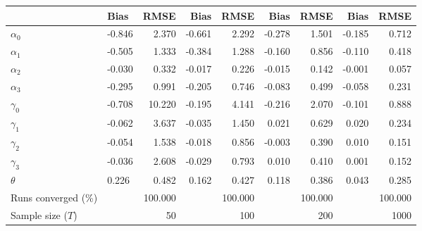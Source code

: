 
\begin{tabular}[t]{llrrrrrrr}
\toprule
  & Bias & RMSE & Bias & RMSE & Bias & RMSE & Bias & RMSE\\
\midrule
$\alpha_{0}$ & -0.846 & 2.370 & -0.661 & 2.292 & -0.278 & 1.501 & -0.185 & 0.712\\
$\alpha_{1}$ & -0.505 & 1.333 & -0.384 & 1.288 & -0.160 & 0.856 & -0.110 & 0.418\\
$\alpha_{2}$ & -0.030 & 0.332 & -0.017 & 0.226 & -0.015 & 0.142 & -0.001 & 0.057\\
$\alpha_{3}$ & -0.295 & 0.991 & -0.205 & 0.746 & -0.083 & 0.499 & -0.058 & 0.231\\
$\gamma_{0}$ & -0.708 & 10.220 & -0.195 & 4.141 & -0.216 & 2.070 & -0.101 & 0.888\\
$\gamma_{1}$ & -0.062 & 3.637 & -0.035 & 1.450 & 0.021 & 0.629 & 0.020 & 0.234\\
$\gamma_{2}$ & -0.054 & 1.538 & -0.018 & 0.856 & -0.003 & 0.390 & 0.010 & 0.151\\
$\gamma_{3}$ & -0.036 & 2.608 & -0.029 & 0.793 & 0.010 & 0.410 & 0.001 & 0.152\\
$\theta$ & 0.226 & 0.482 & 0.162 & 0.427 & 0.118 & 0.386 & 0.043 & 0.285\\
Runs converged (\%) &  & 100.000 &  & 100.000 &  & 100.000 &  & 100.000\\
Sample size ($T$) &  & 50 &  & 100 &  & 200 &  & 1000\\
\bottomrule
\end{tabular}
